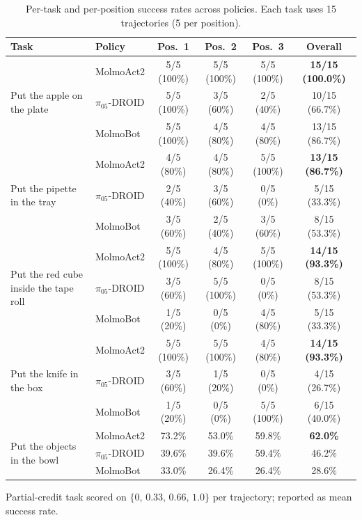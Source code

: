 \begin{table}[h]
\centering
\caption{Per-task and per-position success rates across policies. Each task uses 15 trajectories (5 per position).}
\label{tab:policy-results}
\begin{threeparttable}
\begin{tabular}{llcccc}
\toprule
\textbf{Task} & \textbf{Policy} & \textbf{Pos.\ 1} & \textbf{Pos.\ 2} & \textbf{Pos.\ 3} & \textbf{Overall} \\
\midrule
\multirow{3}{*}{Put the apple on the plate}
  & MolmoAct2 & 5/5 (100\%) & 5/5 (100\%) & 5/5 (100\%) & \textbf{15/15 (100.0\%)} \\
  & $\pi_05$-DROID   & 5/5 (100\%) & 3/5 (60\%)  & 2/5 (40\%)  & 10/15 (66.7\%) \\
  & MolmoBot  & 5/5 (100\%) & 4/5 (80\%)  & 4/5 (80\%)  & 13/15 (86.7\%) \\
\midrule
\multirow{3}{*}{Put the pipette in the tray}
  & MolmoAct2 & 4/5 (80\%)  & 4/5 (80\%)  & 5/5 (100\%) & \textbf{13/15 (86.7\%)} \\
  & $\pi_05$-DROID   & 2/5 (40\%)  & 3/5 (60\%)  & 0/5 (0\%)   & 5/15 (33.3\%) \\
  & MolmoBot  & 3/5 (60\%)  & 2/5 (40\%)  & 3/5 (60\%)  & 8/15 (53.3\%) \\
\midrule
\multirow{3}{*}{Put the red cube inside the tape roll}
  & MolmoAct2 & 5/5 (100\%) & 4/5 (80\%)  & 5/5 (100\%) & \textbf{14/15 (93.3\%)} \\
  & $\pi_05$-DROID   & 3/5 (60\%)  & 5/5 (100\%) & 0/5 (0\%)   & 8/15 (53.3\%) \\
  & MolmoBot  & 1/5 (20\%)  & 0/5 (0\%)   & 4/5 (80\%)  & 5/15 (33.3\%) \\
\midrule
\multirow{3}{*}{Put the knife in the box}
  & MolmoAct2 & 5/5 (100\%) & 5/5 (100\%) & 4/5 (80\%)  & \textbf{14/15 (93.3\%)} \\
  & $\pi_05$-DROID   & 3/5 (60\%)  & 1/5 (20\%)  & 0/5 (0\%)   & 4/15 (26.7\%) \\
  & MolmoBot  & 1/5 (20\%)  & 0/5 (0\%)   & 5/5 (100\%) & 6/15 (40.0\%) \\
\midrule
\multirow{3}{*}{Put the objects in the bowl\tnote{a}}
  & MolmoAct2 & 73.2\% & 53.0\% & 59.8\% & \textbf{62.0\%} \\
  & $\pi_05$-DROID   & 39.6\% & 39.6\% & 59.4\% & 46.2\% \\
  & MolmoBot  & 33.0\% & 26.4\% & 26.4\% & 28.6\% \\
\bottomrule
\end{tabular}
\begin{tablenotes}\footnotesize
\item[a] Partial-credit task scored on $\{0,\,0.33,\,0.66,\,1.0\}$ per trajectory; reported as mean success rate.
\end{tablenotes}
\end{threeparttable}
\end{table}

